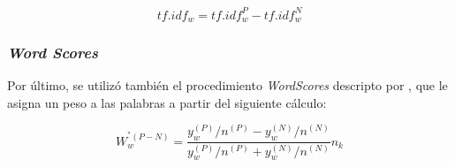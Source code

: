 \begin{equation*}
    tf.idf_{w} = tf.idf_{w}^{P}-tf.idf_{w}^{N}
\end{equation*}

\subsubsection{\textit{Word Scores}}
Por \'ultimo, se utiliz\'o tambi\'en el procedimiento \textit{WordScores} descripto por
\cite{laver2003extracting}, que le asigna un peso a las palabras a partir
del siguiente c\'alculo:

\begin{equation*}
    W_{w}^{^*(P-N)} = \frac{y_{w}^{(P)}/n^{(P)}-y_{w}^{(N)}/n^{(N)}}{y_{w}^{(P)}/n^{(P)}+y_{w}^{(N)}/n^{(N)}}n_{k}
\end{equation*}

